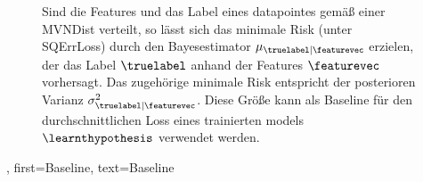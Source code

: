{{{{{		\begin{figure}[H]
			\begin{center}
			\end{center}
			\caption{Sind die \gls{Features} und das \gls{Label} eines \gls{datapoint}es gemäß einer \gls{MVNDist} verteilt,
			 so lässt sich das minimale \gls{Risk} (unter \gls{SQErrLoss}) durch den \gls{Bayesestimator} $\mu_{\truelabel|\featurevec}$ 
			 erzielen, der das \gls{Label} $\truelabel$ anhand der \gls{Features} $\featurevec$ vorhersagt. Das zugehörige 
			 minimale \gls{Risk} entspricht der posterioren Varianz $\sigma^{2}_{\truelabel|\featurevec}$. Diese Größe kann 
			 als Baseline für den durchschnittlichen \gls{Loss} eines trainierten \gls{model}s $\learnthypothesis$ verwendet werden.\label{fig_post_baseline_dict}}
		\end{figure}
	},
	first={Baseline},
	text={Baseline}
}

}}}
